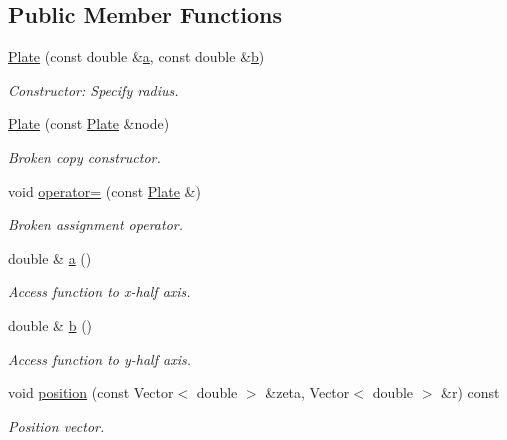 \subsection*{Public Member Functions}
\begin{DoxyCompactItemize}
\item 
\hyperlink{classoomph_1_1Plate_a61811f7521511ed6e82758d050fa8d69}{Plate} (const double \&\hyperlink{classoomph_1_1Plate_a5bf44a99e0504b4c1185656d6b1b9740}{a}, const double \&\hyperlink{classoomph_1_1Plate_a24a8bd078b3b675c97203ba6cfa6119b}{b})
\begin{DoxyCompactList}\small\item\em Constructor\+: Specify radius. \end{DoxyCompactList}\item 
\hyperlink{classoomph_1_1Plate_a18b86a428438bed97cb98e9e138b9404}{Plate} (const \hyperlink{classoomph_1_1Plate}{Plate} \&node)
\begin{DoxyCompactList}\small\item\em Broken copy constructor. \end{DoxyCompactList}\item 
void \hyperlink{classoomph_1_1Plate_aaa31862fcb1a579c95035cfeca7f8e7e}{operator=} (const \hyperlink{classoomph_1_1Plate}{Plate} \&)
\begin{DoxyCompactList}\small\item\em Broken assignment operator. \end{DoxyCompactList}\item 
double \& \hyperlink{classoomph_1_1Plate_a5bf44a99e0504b4c1185656d6b1b9740}{a} ()
\begin{DoxyCompactList}\small\item\em Access function to x-\/half axis. \end{DoxyCompactList}\item 
double \& \hyperlink{classoomph_1_1Plate_a24a8bd078b3b675c97203ba6cfa6119b}{b} ()
\begin{DoxyCompactList}\small\item\em Access function to y-\/half axis. \end{DoxyCompactList}\item 
void \hyperlink{classoomph_1_1Plate_ad443e4bfc90da07a5d32083d341586dc}{position} (const Vector$<$ double $>$ \&zeta, Vector$<$ double $>$ \&r) const
\begin{DoxyCompactList}\small\item\em Position vector. \end{DoxyCompactList}\item 

\end{DoxyCompactItemize}
